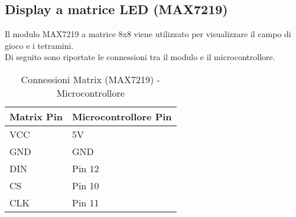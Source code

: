 \documentclass[a4paper, 12pt]{article}
\begin{document}
\subsection{Display a matrice LED (MAX7219)}
Il modulo MAX7219 a matrice 8x8 viene utilizzato per visualizzare il campo di gioco e i tetramini.\\
Di seguito sono riportate le connessioni tra il modulo e il microcontrollore.
\begin{table}[H]
    \centering
    \caption{Connessioni Matrix (MAX7219) - Microcontrollore}
    \label{tab:matrix-max7219-connections}
    \begin{tabular}{ll}
        \toprule
        \textbf{Matrix Pin} & \textbf{Microcontrollore Pin} \\
        \midrule
        VCC                 & 5V                            \\
        GND                 & GND                           \\
        DIN                 & Pin 12                        \\
        CS                  & Pin 10                        \\
        CLK                 & Pin 11                        \\
        \bottomrule
    \end{tabular}
\end{table}
\end{document}
